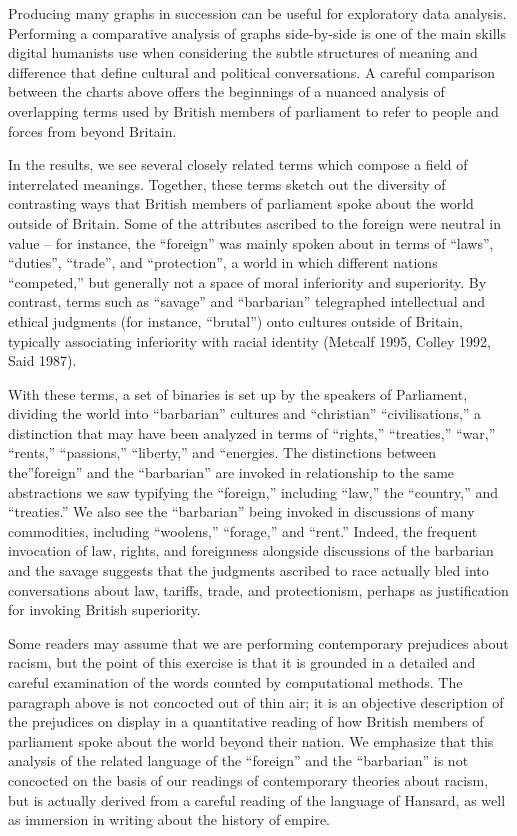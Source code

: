 \documentclass[
]{article}
\begin{document}
Producing many graphs in succession can be useful for exploratory data
analysis. Performing a comparative analysis of graphs side-by-side is
one of the main skills digital humanists use when considering the subtle
structures of meaning and difference that define cultural and political
conversations. A careful comparison between the charts above offers the
beginnings of a nuanced analysis of overlapping terms used by British
members of parliament to refer to people and forces from beyond Britain.

In the results, we see several closely related terms which compose a
field of interrelated meanings. Together, these terms sketch out the
diversity of contrasting ways that British members of parliament spoke
about the world outside of Britain. Some of the attributes ascribed to
the foreign were neutral in value -- for instance, the ``foreign'' was
mainly spoken about in terms of ``laws'', ``duties'', ``trade'', and
``protection'', a world in which different nations ``competed,'' but
generally not a space of moral inferiority and superiority. By contrast,
terms such as ``savage'' and ``barbarian'' telegraphed intellectual and
ethical judgments (for instance, ``brutal'') onto cultures outside of
Britain, typically associating inferiority with racial identity (Metcalf
1995, Colley 1992, Said 1987).

With these terms, a set of binaries is set up by the speakers of
Parliament, dividing the world into ``barbarian'' cultures and
``christian'' ``civilisations,'' a distinction that may have been
analyzed in terms of ``rights,'' ``treaties,'' ``war,'' ``rents,''
``passions,'' ``liberty,'' and ``energies. The distinctions between
the''foreign'' and the ``barbarian'' are invoked in relationship to the
same abstractions we saw typifying the ``foreign,'' including ``law,''
the ``country,'' and ``treaties.'' We also see the ``barbarian'' being
invoked in discussions of many commodities, including ``woolens,''
``forage,'' and ``rent.'' Indeed, the frequent invocation of law,
rights, and foreignness alongside discussions of the barbarian and the
savage suggests that the judgments ascribed to race actually bled into
conversations about law, tariffs, trade, and protectionism, perhaps as
justification for invoking British superiority.

Some readers may assume that we are performing contemporary prejudices
about racism, but the point of this exercise is that it is grounded in a
detailed and careful examination of the words counted by computational
methods. The paragraph above is not concocted out of thin air; it is an
objective description of the prejudices on display in a quantitative
reading of how British members of parliament spoke about the world
beyond their nation. We emphasize that this analysis of the related
language of the ``foreign'' and the ``barbarian'' is not concocted on
the basis of our readings of contemporary theories about racism, but is
actually derived from a careful reading of the language of Hansard, as
well as immersion in writing about the history of empire.
\end{document}
